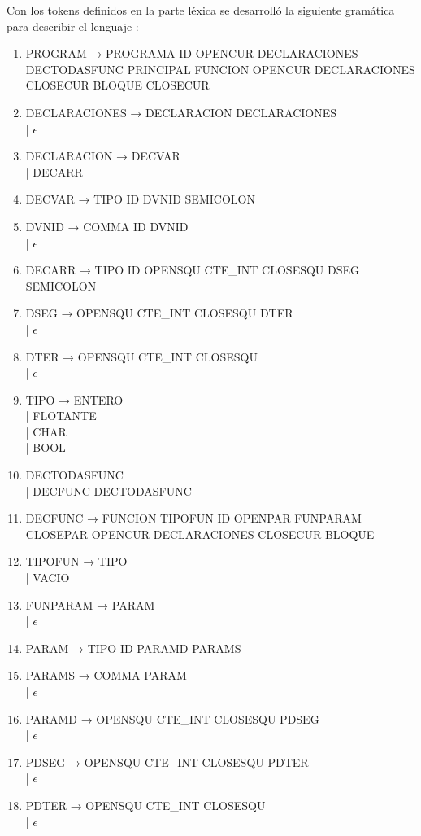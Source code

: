 Con los tokens definidos en la parte léxica se desarrolló la siguiente gramática para describir el lenguaje :

{\small
\begin{enumerate}
    \item PROGRAM → PROGRAMA ID OPENCUR DECLARACIONES DECTODASFUNC PRINCIPAL FUNCION OPENCUR DECLARACIONES CLOSECUR BLOQUE CLOSECUR
    \item DECLARACIONES → DECLARACION DECLARACIONES \\ | $\epsilon$
    \item DECLARACION → DECVAR \\ \quad | DECARR
    \item DECVAR → TIPO ID DVNID SEMICOLON
    \item DVNID → COMMA ID DVNID \\ | $\epsilon$
    \item DECARR → TIPO ID OPENSQU CTE\_INT CLOSESQU DSEG SEMICOLON
    \item DSEG → OPENSQU CTE\_INT CLOSESQU DTER \\ | $\epsilon$
    \item DTER → OPENSQU CTE\_INT CLOSESQU \\ | $\epsilon$
    \item TIPO → ENTERO \\ | FLOTANTE \\ | CHAR \\ | BOOL
    \item DECTODASFUNC \\ | DECFUNC DECTODASFUNC
    \item DECFUNC →  FUNCION TIPOFUN ID OPENPAR FUNPARAM CLOSEPAR OPENCUR DECLARACIONES CLOSECUR BLOQUE
    \item TIPOFUN → TIPO \\ | VACIO
    \item FUNPARAM → PARAM \\ | $\epsilon$
    \item PARAM → TIPO ID PARAMD PARAMS
    \item PARAMS → COMMA PARAM \\ | $\epsilon$
    \item PARAMD → OPENSQU CTE\_INT CLOSESQU PDSEG \\ | $\epsilon$
    \item PDSEG → OPENSQU CTE\_INT CLOSESQU PDTER \\ | $\epsilon$
    \item PDTER → OPENSQU CTE\_INT CLOSESQU \\ | $\epsilon$

\end{enumerate}}
